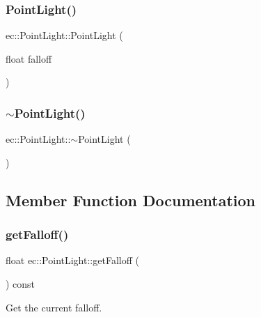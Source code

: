 \subsubsection{\texorpdfstring{Point\+Light()}{PointLight()}}
{\footnotesize\ttfamily ec\+::\+Point\+Light\+::\+Point\+Light (\begin{DoxyParamCaption}\item[{float}]{falloff }\end{DoxyParamCaption})\hspace{0.3cm}{\ttfamily [explicit]}}

\mbox{\label{classec_1_1_point_light_aef9daa8a54baa73d1dfc724100cfbf38}} 
\subsubsection{\texorpdfstring{$\sim$\+Point\+Light()}{~PointLight()}}
{\footnotesize\ttfamily ec\+::\+Point\+Light\+::$\sim$\+Point\+Light (\begin{DoxyParamCaption}{ }\end{DoxyParamCaption})\hspace{0.3cm}{\ttfamily [default]}}



\subsection{Member Function Documentation}
\mbox{\label{classec_1_1_point_light_a916752aad9fa46fc86c8df3fe1f796cb}} 
\subsubsection{\texorpdfstring{get\+Falloff()}{getFalloff()}}
{\footnotesize\ttfamily float ec\+::\+Point\+Light\+::get\+Falloff (\begin{DoxyParamCaption}{ }\end{DoxyParamCaption}) const}



Get the current falloff. 

